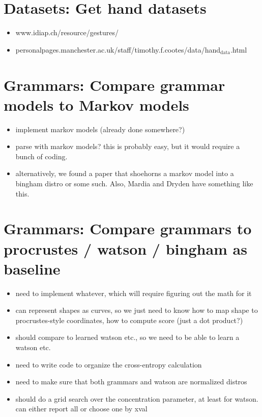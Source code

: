 \documentclass{book}
\begin{document}
\section{Datasets: Get hand datasets}
\label{sec-7_8}


\begin{itemize}
\item www.idiap.ch/resource/gestures/
\item personalpages.manchester.ac.uk/staff/timothy.f.cootes/data/hand$_{\mathrm{data}}$.html
\end{itemize}
\section{Grammars: Compare grammar models to Markov models}
\label{sec-7_9}

\begin{itemize}
\item implement markov models (already done somewhere?)
\item parse with markov models? this is probably easy, but it would
    require a bunch of coding.
\item alternatively, we found a paper that shoehorns a markov model into
    a bingham distro or some such. Also, Mardia and Dryden have
    something like this.
\end{itemize}
\section{Grammars: Compare grammars to procrustes / watson / bingham as baseline}
\label{sec-7_10}

\begin{itemize}
\item need to implement whatever, which will require figuring out the
    math for it
\item can represent shapes as curves, so we just need to know how to map
    shape to procrustes-style coordinates, how to compute score (just
    a dot product?)
\item should compare to learned watson etc., so we need to be able to learn a
    watson etc.
\item need to write code to organize the cross-entropy calculation
\item need to make sure that both grammars and watson are normalized distros
\item should do a grid search over the concentration parameter, at least
    for watson. can either report all or choose one by xval
\end{itemize}
\end{document}
